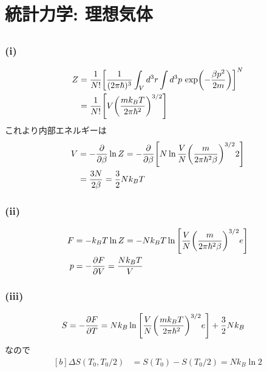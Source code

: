 \documentclass[../../sp_2017.tex]{subfiles}
\begin{document}
\setcounter{section}{1}
\section{統計力学: 理想気体}
\subsection{}
\subsubsection{(i)}
\begin{equation}\begin{aligned}[b]
    Z &= \frac{1}{N!}\qty[\frac{1}{(2\pi\hbar)^3}\int_V d^3r\int d^3p\, \exp(-\frac{\beta p^2}{2m})]^N\\
    &= \frac{1}{N!}\qty[V\qty(\frac{mk_BT}{2\pi\hbar^2})^{3/2}]
\end{aligned}\end{equation}
これより内部エネルギーは
\begin{equation}\begin{aligned}[b]
    V &= -\pdv{\beta}\ln Z = -\pdv{\beta}\qty[N\ln\frac{V}{N}\qty(\frac{m}{2\pi\hbar^2\beta})^{3/2}2]\\
    &= \frac{3N}{2\beta}=\frac{3}{2}Nk_BT
\end{aligned}\end{equation}

\subsubsection{(ii)}
\begin{equation}\begin{aligned}[b]
    F &= -k_BT\ln Z=-Nk_BT\ln\qty[\frac{V}{N}\qty(\frac{m}{2\pi\hbar^2\beta})^{3/2}e]\\
    p &= -\pdv{F}{V} = \frac{Nk_BT}{V}
\end{aligned}\end{equation}

\subsubsection{(iii)}
\begin{equation}\begin{aligned}[b]
    S &= -\pdv{F}{T} =Nk_B\ln\qty[\frac{V}{N}\qty(\frac{mk_BT}{2\pi\hbar^2})^{3/2}e]+\frac{3}{2}Nk_B
\end{aligned}\end{equation}
なので
\begin{equation}\begin{aligned}[b]
    \Delta S(T_0,T_0/2) &= S(T_0)-S(T_0/2) = Nk_B\ln 2
\end{aligned}\end{equation}
\end{document}
